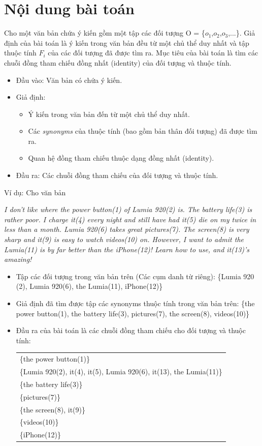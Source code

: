\documentclass[12pt]{report}
\begin{document}
		\section{Nội dung bài toán}
			\par Cho một văn bản chứa ý kiến gồm một tập các đối tượng O = \{$o_1$,$o_2$,$o_3$,...\}. Giả định của bài toán là ý kiến trong văn bản đều từ một chủ thể duy nhất và tập thuộc tính $F_i$ của các đối tượng đã được tìm ra. Mục tiêu của bài toán là tìm các chuỗi đồng tham chiếu đồng nhất (identity) của đối tượng và thuộc tính.
			\begin{itemize}
				\item{Đầu vào: Văn bản có chứa ý kiến.}
				\item{Giả định:
				\begin{itemize}
					\item{Ý kiến trong văn bản đến từ một chủ thể duy nhất.}
					\item{Các \textit{synonyms} của thuộc tính (bao gồm bản thân đối tượng) đã được tìm ra.}
					\item{Quan hệ đồng tham chiếu thuộc dạng đồng nhất (identity).}
				\end{itemize}}
				\item{Đầu ra: Các chuỗi đồng tham chiếu của đối tượng và thuộc tính.}
			\end{itemize}
			\par Ví dụ: Cho văn bản \\
			\par \textit{I don't like where the power button(1) of Lumia 920(2) is. The battery life(3) is rather poor. I charge it(4) every night and still have had it(5) die on my twice in less than a month. Lumia 920(6) takes great pictures(7). The screen(8) is very sharp and it(9) is easy to watch videos(10) on. However, I want to admit the Lumia(11) is by far better than the iPhone(12)! Learn how to use, and it(13)'s amazing!}	
			\begin{itemize}		
			\item{Tập các đối tượng trong văn bản trên (Các cụm danh từ riêng): \{Lumia 920 (2), Lumia 920(6), the Lumia(11), iPhone(12)\}}
			\item{Giả định đã tìm được tập các synonyms thuộc tính trong văn bản trên: \{the power button(1), the battery life(3), pictures(7), the screen(8), videos(10)\}}
			\item{Đầu ra của bài toán là các chuỗi đồng tham chiếu cho đối tượng và thuộc tính:						
				\begin{center}
					\begin{tabular}{l}
						\{the power button(1)\}
						\\\{Lumia 920(2), it(4), it(5), Lumia 920(6), it(13), the Lumia(11)\}
						\\\{the battery life(3)\}
						\\\{pictures(7)\}
						\\\{the screen(8), it(9)\}
						\\\{videos(10)\}
						\\\{iPhone(12)\}
					\end{tabular}
			 	\end{center}}
		 	\end{itemize}
\end{document}
